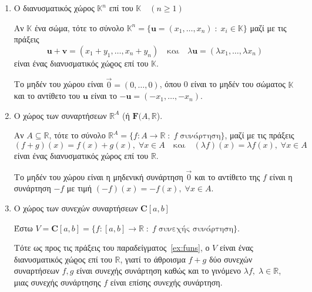 \begin{examples}
\item {}
    \begin{enumerate}
        \item \label{ex:Rn}\textcolor{Col2}{Ο διανυσματικός χώρος $ \mathbb{K}^{n} $ 
            επί του $ \mathbb{K} \quad (n \geq 1) $}

            Αν $ \mathbb{K} $ ένα σώμα, τότε το σύνολο $ \mathbb{K}^{n} = 
            \{ \mathbf{u} = (x_{1},\ldots,x_{n}) \; : \; x_{i} \in \mathbb{K}\} $ 
            μαζί με τις πράξεις 
            \[
                \mathbf{u}+ \mathbf{v} = (x_{1}+ y_{1}, \ldots , x_{n}+y_{n}) 
                \quad \text{και} \quad \lambda \mathbf{u} = 
                ( \lambda x_{1}, \ldots, \lambda x_{n})
            \]
            είναι ένας διανυσματικός χώϱος επί του $ \mathbb{K} $. 

            Το μηδέν του χώρου 
            είναι $ \vec{0} = (0,\ldots,0) $, όπου 0 είναι το μηδέν του σώματος 
            $ \mathbb{K} $ και το αντίθετο του $ \mathbf{u} $ είναι το $ - \mathbf{u} =
            (- x_{1}, \ldots, - x_{n}) $.

        \item\label{ex:funs} \textcolor{Col2}{Ο χώρος των συναρτήσεων $\mathbb{R} ^{A}$ 
            (ή $\mathbf{F}(A, \mathbb{R}$)}.

            Αν $ A \subseteq \mathbb{R} $, τότε το σύνολο $ \mathbb{R}^{A} = 
            \{ f \colon A \to \mathbb{R} \; : \; f \; \text{συνάρτηση} \} $, μαζί με 
            τις πράξεις
            \[
                (f+g)(x) = f(x) +g(x), \; \forall x \in A \quad \text{και} 
                \quad (\lambda f)(x)= \lambda f(x), \; \forall x \in A
            \] 
            είναι ένας διανυσματικός χώρος επί του $ \mathbb{R} $.

            Το μηδέν του χώρου είναι η μηδενική συνάρτηση $ \vec{0} $ και το 
            αντίθετο της $f$ είναι η συνάρτηση $ -f $ με τιμή $ (-f)(x) = 
            - f(x), \; \forall x \in A $.

        \item \textcolor{Col2}{Ο χώρος των συνεχών συναρτήσεων $ \mathbf{C}[a,b] $}

            Έστω $ V = \mathbf{C}{[a,b]} = \{ f \colon [a,b] \to \mathbb{R} \; 
            : \; f \; \text{συνεχής συνάρτηση} \}  $. 

            Τότε ως προς τις πράξεις του 
            παραδείγματος~\ref{ex:funs}, ο $V$ είναι ένας διανυσματικός χώϱος 
            επί του $ \mathbb{R} $, 
            γιατί το άθροισμα $ f+g $ δύο συνεχών συναρτήσεων $ f,g $ είναι 
            συνεχής συνάρτηση καθώς και το γινόμενο 
            $ \lambda f, \; \lambda \in \mathbb{R} $, μιας συνεχής συνάρτησης 
            $f$ είναι επίσης συνεχής συνάρτηση. 


\end{enumerate}
\end{examples}
